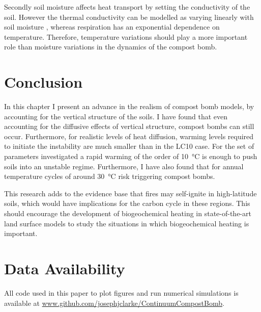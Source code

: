 Secondly soil moisture affects heat transport by setting the conductivity of the soil. However the thermal conductivity can be
modelled as varying linearly with soil moisture \parencite{Best2011}, whereas respiration has an exponential dependence on temperature. Therefore, temperature variations
should play a more important role than moisture variations in the dynamics of the compost bomb.


\section{Conclusion}
\label{sec:conclusion}
In this chapter I present an advance in the realism of compost bomb models, by accounting for the vertical structure of the soils. I have found that even accounting
for the diffusive effects of vertical structure, compost bombs can still occur. Furthermore, for realistic levels of heat diffusion,
warming levels required to initiate the instability are much smaller than in the LC10 case. For the set of parameters investigated a rapid warming of the order of \SI{10}{\degreeCelsius} is
enough to push soils into an unstable regime. Furthermore, I have also found that for annual temperature cycles of around \SI{30}{\degreeCelsius} risk triggering compost bombs.

This research adds to the evidence base that fires may self-ignite in high-latitude soils, which would have implications for the carbon cycle in these regions.
This should encourage the development of biogeochemical heating in state-of-the-art land surface models to study the situations in which biogeochemical heating is important.

\section{Data Availability}
All code used in this paper to plot figures and run numerical simulations is available at \url{www.github.com/josephjclarke/ContinuumCompostBomb}.


